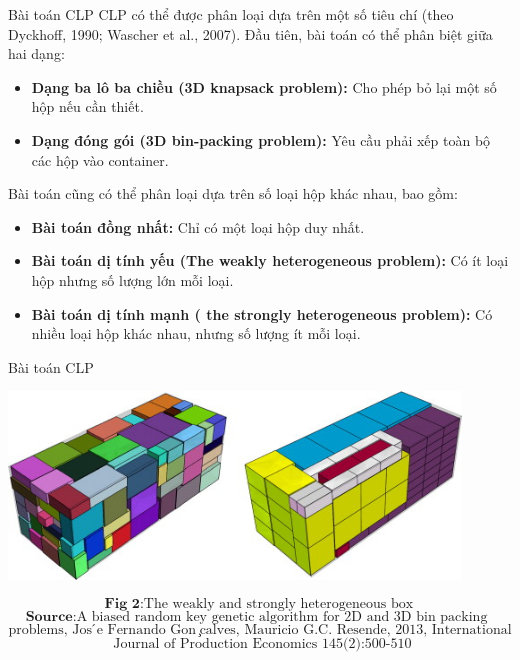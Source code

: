 \documentclass[10pt]{beamer}
\newenvironment{tres important}[2][]{
	\setkeys{EmphEqEnv}{#2}
	\setkeys{EmphEqOpt}{box={\setlength{\fboxsep}{10pt}\fcolorbox{myNewColorA}{white}},#1}
	\EmphEqMainEnv}
{\endEmphEqMainEnv}
\begin{document}
        \begin{frame}{Bài toán CLP}
            CLP có thể được phân loại dựa trên một số tiêu chí (theo Dyckhoff, 1990; Wascher et al., 2007). Đầu tiên, bài toán có thể phân biệt giữa hai dạng:
            \pause %
            \begin{itemize}
                \item \textbf{Dạng ba lô ba chiều (3D knapsack problem):} Cho phép bỏ lại một số hộp nếu cần thiết.
                \item \textbf{Dạng đóng gói (3D bin-packing problem):} Yêu cầu phải xếp toàn bộ các hộp vào container.
            \end{itemize}
            \vspace{0.5cm}
            \pause %
            Bài toán cũng có thể phân loại dựa trên số loại hộp khác nhau, bao gồm:
            \pause %
            \begin{itemize}
                \item \textbf{Bài toán đồng nhất:} Chỉ có một loại hộp duy nhất.
                \item \textbf{Bài toán dị tính yếu (The weakly 
heterogeneous problem):} Có ít loại hộp nhưng số lượng lớn mỗi loại.
                \item \textbf{Bài toán dị tính mạnh ( the strongly 
heterogeneous problem):} Có nhiều loại hộp khác nhau, nhưng số lượng ít mỗi loại.
            \end{itemize}
        \end{frame}

        \begin{frame}{Bài toán CLP}
            \begin{center}
                \includegraphics[width=0.9\textwidth]{assets/IntroForCLP_SecondPic.jpg}
            \end{center}
            \[{\textbf{Fig 2}: \text{The weakly and strongly heterogeneous box}}\]
            \[{\textbf{Source}: \text{A biased random key genetic algorithm for 2D and 3D bin packing }}\]
            \[\text{problems, Jos ́e Fernando Gon ̧calves, Mauricio G.C. Resende, 2013, International}\]
            \[\text{ Journal of Production Economics 145(2):500-510}\]
        \end{frame}
\end{document}
